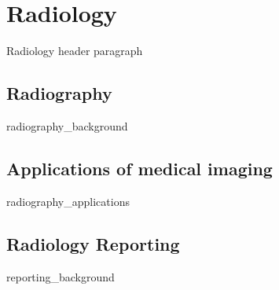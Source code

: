 \chapter{Radiology}
Radiology header paragraph

\section{Radiography}
{radiography_background}

\section{Applications of medical imaging}
{radiography_applications}

\section{Radiology Reporting}
{reporting_background}
\clearpage